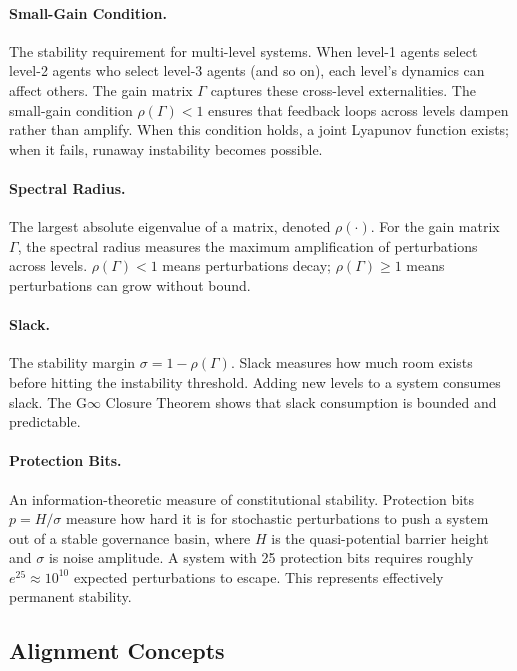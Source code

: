 \documentclass[12pt]{article}
\begin{document}
\paragraph{Small-Gain Condition.} The stability requirement for multi-level systems. When level-1 agents select level-2 agents who select level-3 agents (and so on), each level's dynamics can affect others. The gain matrix $\Gamma$ captures these cross-level externalities. The small-gain condition $\rho(\Gamma) < 1$ ensures that feedback loops across levels dampen rather than amplify. When this condition holds, a joint Lyapunov function exists; when it fails, runaway instability becomes possible.

\paragraph{Spectral Radius.} The largest absolute eigenvalue of a matrix, denoted $\rho(\cdot)$. For the gain matrix $\Gamma$, the spectral radius measures the maximum amplification of perturbations across levels. $\rho(\Gamma) < 1$ means perturbations decay; $\rho(\Gamma) \geq 1$ means perturbations can grow without bound.

\paragraph{Slack.} The stability margin $\sigma = 1 - \rho(\Gamma)$. Slack measures how much room exists before hitting the instability threshold. Adding new levels to a system consumes slack. The G$\infty$ Closure Theorem shows that slack consumption is bounded and predictable.

\paragraph{Protection Bits.} An information-theoretic measure of constitutional stability. Protection bits $p = H/\sigma$ measure how hard it is for stochastic perturbations to push a system out of a stable governance basin, where $H$ is the quasi-potential barrier height and $\sigma$ is noise amplitude. A system with 25 protection bits requires roughly $e^{25} \approx 10^{10}$ expected perturbations to escape. This represents effectively permanent stability.

\subsection{Alignment Concepts}
\end{document}
